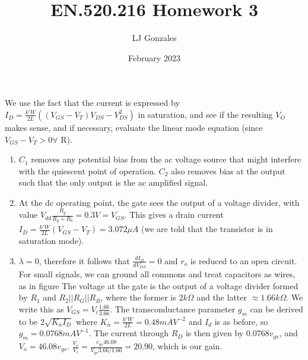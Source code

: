 \documentclass{article}
\title{EN.520.216 Homework 3}
\author{LJ Gonzales}
\date{February 2023}
\begin{document}
\maketitle
\begin{prob}
	
\end{prob}
\begin{prob}
	We use the fact that the current is expressed by $I_D=\frac{k'W}{2L}((V_{GS}-V_T)V_{DS}-V_{DS}^2)$ in saturation, and see if the resulting $V_O$ makes sense, and if necessary, evaluate the linear mode equation (since $V_{GS}-V_T > 0 \forall$ R).
\end{prob}

\begin{prob}
\begin{enumerate}
\item	$C_1$ removes any potential bias from the ac voltage source that might interfere with the quiescent point of operation.
	$C_2$ also removes bias at the output such that the only output is the ac amplified signal.

\item At the dc operating point, the gate sees the output of a voltage divider, with value $V_{dd}\frac{R_g}{R_g+R_b}= 0.3V=V_{GS}$.
	This gives a drain current $I_D=\frac{k'W}{2L}(V_{GS}-V_T)=3.072\mu A$ (we are told that the transistor is in saturation mode). 
\item $\lambda=0$, therefore it follows that  $\frac{dI_D}{dV_{DS}}=0$ and $r_o$ is reduced to an open circuit.
	For small signals, we can ground all commons and treat capacitors as wires, as in figure %
	The voltage at the gate is the output of a voltage divider formed by $R_1$ and $R_2||R_G||R_B$, where the former is $2k\Omega$ and the latter $\approx1.66k\Omega$.
	We write this as $V_{GS}=V_i\frac{1.66}{3.66}$.
	The transconductance parameter $g_m$ can be derived to be $2\sqrt{K_nI_D}$ where $K_n=\frac{k'W}{2L}=0.48mAV^{-2}$ and $I_d$ is as before, so $g_m=0.0768mAV^{-1}$.
	The current through $R_D$ is then given by $0.0768v_{gs}$, and $V_o= 46.08v_{gs}$.
	$\frac{V_o}{V_i}=\frac{v_{gs}46.08}{V_{gs}3.66/1.66} = 20.90$, which is our gain.
	\end{enumerate}
\end{prob}
\end{document}
